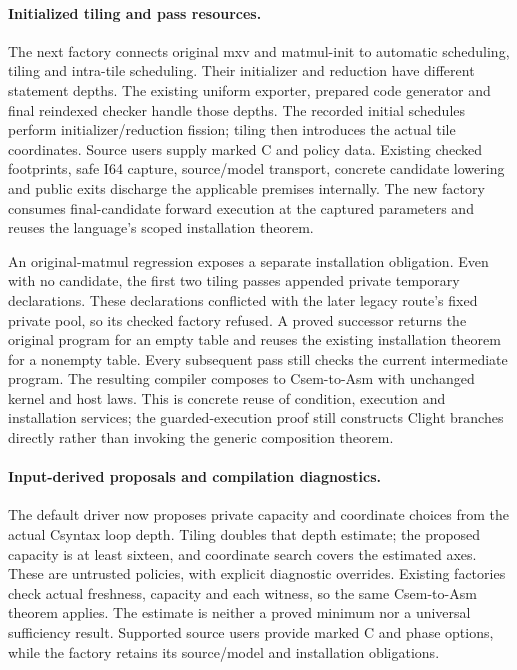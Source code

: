 \paragraph{Initialized tiling and pass resources.}
The next factory connects original mxv and matmul-init to automatic scheduling,
tiling and intra-tile scheduling. Their initializer and reduction have different
statement depths. The existing uniform exporter, prepared code generator and
final reindexed checker handle those depths. The recorded initial schedules
perform initializer/reduction fission; tiling then introduces the actual tile
coordinates. Source users supply marked C and policy data. Existing checked
footprints, safe I64 capture, source/model transport, concrete candidate
lowering and public exits discharge the applicable premises internally.
The new factory consumes final-candidate forward execution at the captured
parameters and reuses the language's scoped installation theorem.

An original-matmul regression exposes a separate installation obligation.
Even with no candidate, the first two tiling passes appended private temporary
declarations. These declarations conflicted with the later legacy route's
fixed private pool, so its checked factory refused. A proved successor returns
the original program for an empty table and reuses the existing installation
theorem for a nonempty table. Every subsequent pass still checks the current
intermediate program. The resulting compiler composes to Csem-to-Asm with
unchanged kernel and host laws. This is concrete reuse of condition, execution
and installation services; the guarded-execution proof still constructs Clight
branches directly rather than invoking the generic composition theorem.

\paragraph{Input-derived proposals and compilation diagnostics.}
The default driver now proposes private capacity and coordinate choices from
the actual Csyntax loop depth. Tiling doubles that depth estimate; the proposed
capacity is at least sixteen, and coordinate search covers the estimated axes.
These are untrusted policies, with explicit diagnostic overrides. Existing
factories check actual freshness, capacity and each witness, so the same
Csem-to-Asm theorem applies. The estimate is neither a proved minimum nor a
universal sufficiency result. Supported source users provide marked C and phase
options, while the factory retains its source/model and installation obligations.

